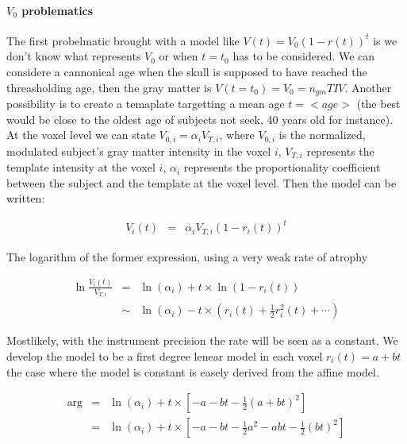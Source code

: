 \documentclass[final, paper=letter,5p,times,twocolumn]{elsarticle}
\theoremstyle{definition}
\begin{document}
\paragraph{$V_{0}$ problematics}{The first probelmatic brought with a model like $V(t) = V_{0}(1 - r(t))^{t}$ is we don't know what represents $V_{0}$ or when $t=t_{0}$ has to be considered. We can considere a cannonical age when the skull is supposed to have reached the threasholding age, then the gray matter is $V(t=t_{0}) = V_{0} = n_{gm}TIV$. Another possibility is to create a temaplate targetting a mean age $t = <age>$ (the best would be close to the oldest age of subjects not seek, 40 years old for instance). At the voxel level we can state $V_{0,i} = \alpha_{i}V_{T,i}$, where $V_{0,i}$ is the normalized, modulated subject's gray matter intensity in the voxel $i$, $V_{T,i}$ represents the template intensity at the voxel $i$, $\alpha_{i}$ represents the proportionality coefficient between the subject and the template at the voxel level. Then the model can be written:

  \begin{equation}
    \left .
    \begin{array}{rcl}
      V_{i}(t) & = & \alpha_{i}V_{T,i} (1 - r_{i}(t))^{t}
    \end{array}
    \right .
    \label{template_model_based}
  \end{equation}

  The logarithm of the former expression, using a very weak rate of atrophy

  \begin{equation}
    \left .
    \begin{array}{rcl}
      \ln\frac{V_{i}(t)}{V_{T,i}} & = & \ln(\alpha_{i}) + t \times \ln(1 - r_{i}(t)) \\
      & \sim & \ln(\alpha_{i}) - t \times \left(r_{i}(t) + \frac{1}{2} r_{i}^{2}(t) + \cdots \right)
    \end{array}
    \right .
    \label{log_template_model_based}
  \end{equation}

  Mostlikely, with the instrument precision the rate will be seen as a constant. We develop the model to be a first degree lenear model in each voxel $r_{i}(t) = a + bt$ the case where the model is constant is easely derived from the affine model.

    \begin{equation}
    \left .
    \begin{array}{rcl}
      \arg & = & \ln(\alpha_{i}) + t \times \left \lbrack -a - bt - \frac{1}{2} \left(  a + bt \right)^{2} \right \rbrack \\
      & = & \ln(\alpha_{i}) + t \times \left \lbrack -a - bt - \frac{1}{2}  a^{2} - abt - \frac{1}{2}(bt)^{2} \right \rbrack \\
    \end{array}
    \right .
    \label{affine_rate_atrophy_model}
  \end{equation}

  
}
\end{document}
